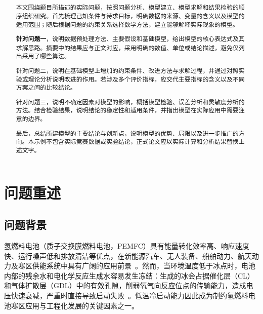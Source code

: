 \documentclass{gmcmthesis}
\title{\underline{\makebox[300bp][c]{研究生数学建模竞赛论文题目}}}
\begin{document}
\makecover
\maketitle

\begin{abstract}
本文围绕题目所描述的实际问题，按照问题分析、模型建立、模型求解和结果检验的顺序组织研究。首先梳理已知条件与待求目标，明确数据的来源、变量的含义以及模型的适用范围；随后根据问题的约束关系选择数学方法，建立能够解释实际现象的模型。

\textbf{针对问题一}，说明数据预处理方法、主要假设和基础模型，给出模型的核心表达式及其求解思路。摘要中的结果应与正文对应，采用明确的数值、单位或结论描述，避免仅列出采用了哪些算法。

针对问题二，说明在基础模型上增加的约束条件、改进方法与求解过程，并通过对照实验或理论分析说明改进的作用。若涉及多个评价指标，应交代主要指标的含义以及不同方案之间的比较结论。

针对问题三，说明不确定因素对模型的影响，概括模型检验、误差分析和灵敏度分析的方法。结合检验结果，说明结论的稳定性和适用条件，并指出模型在实际应用中需要注意的边界。

最后，总结所建模型的主要结论与创新点，说明模型的优势、局限以及进一步推广的方向。本示例不包含实际竞赛数据或实验结论，正式论文应以实际计算和分析结果替换上述文字。
\end{abstract}

\tableofcontents

\section{问题重述}
\label{sec:problem}

\subsection{问题背景}
氢燃料电池（质子交换膜燃料电池，PEMFC）具有能量转化效率高、响应速度快、运行噪声低和排放清洁等优点，在新能源汽车、无人装备、船舶动力、航天动力及寒区供能系统中具有广阔的应用前景~\cite{huang2021lowtemp}。然而，当环境温度低于冰点时，电池内部的残余水和电化学反应生成水容易发生冻结：生成的冰会占据催化层（CL）和气体扩散层（GDL）中的有效孔隙，削弱氧气向反应位点的传输能力，造成电压快速衰减，严重时直接导致启动失败~\cite{luo2018coldstart}。低温冷启动能力因此成为制约氢燃料电池寒区应用与工程化发展的关键因素之一。
\end{document}
